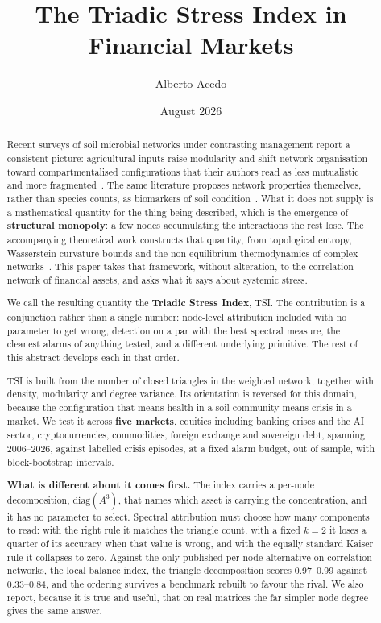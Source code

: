 \documentclass[11pt,a4paper]{article}
\title{\textbf{The Triadic Stress Index in Financial Markets}}
\author[1]{Alberto Acedo}
\affil[1]{Biome Makers Inc. \quad \texttt{acedo@biomemakers.com}}
\date{August 2026}
\begin{document}
\maketitle


\begin{abstract}
Recent surveys of soil microbial networks under contrasting management report a
consistent picture: agricultural inputs raise modularity and shift network
organisation toward compartmentalised configurations that their authors read as
less mutualistic and more fragmented~\cite{saati2026}. The same literature
proposes network properties themselves, rather than species counts, as
biomarkers of soil condition~\cite{ortiz2021}. What it does not supply is a
mathematical quantity for the thing being described, which is the emergence of
\textbf{structural monopoly}: a few nodes accumulating the interactions the rest
lose. The accompanying theoretical work constructs that quantity, from
topological entropy, Wasserstein curvature bounds and the non-equilibrium
thermodynamics of complex networks~\cite{acedo2026fsri}. This paper takes that
framework, without alteration, to the correlation network of financial assets,
and asks what it says about systemic stress.

We call the resulting quantity the \textbf{Triadic Stress Index}, TSI. The
contribution is a conjunction rather than a single number: node-level
attribution included with no parameter to get wrong, detection on a par with the
best spectral measure, the cleanest alarms of anything tested, and a different
underlying primitive. The rest of this abstract develops each in that order.

TSI is built from the number of closed triangles in the weighted
network, together with density, modularity and degree variance. Its orientation is reversed for this domain, because
the configuration that means health in a soil community means crisis in a
market. We test it across \textbf{five markets}, equities including banking
crises and the AI sector, cryptocurrencies, commodities, foreign exchange and
sovereign debt, spanning 2006--2026, against labelled crisis episodes, at a
fixed alarm budget, out of sample, with block-bootstrap intervals.

\textbf{What is different about it comes first.} The index carries a per-node
decomposition, $\mathrm{diag}(A^3)$, that names which asset is carrying the
concentration, and it has no parameter to select. Spectral attribution must
choose how many components to read: with the right rule it matches the triangle
count, with a fixed $k=2$ it loses a quarter of its accuracy when that value is
wrong, and with the equally standard Kaiser rule it collapses to zero. Against
the only published per-node alternative on correlation networks, the local
balance index, the triangle decomposition scores 0.97--0.99 against 0.33--0.84,
and the ordering survives a benchmark rebuilt to favour the rival. We also
report, because it is true and useful, that on real matrices the far simpler
node degree gives the same answer.


\end{abstract}
\end{document}

